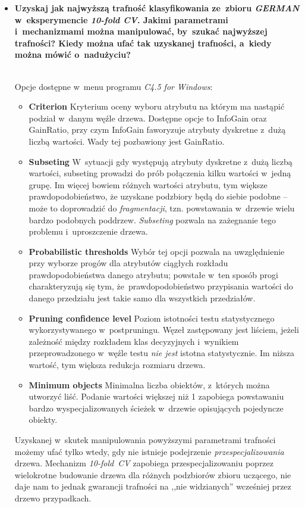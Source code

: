 \begin{itemize}
\item \textbf{Uzyskaj jak najwyższą trafność klasyfikowania ze~zbioru \emph{GERMAN} w~eksperymencie \emph{10-fold CV}. Jakimi parametrami i~mechanizmami można manipulować, by~szukać najwyższej trafności? Kiedy można ufać tak uzyskanej trafności, a~kiedy można mówić o~nadużyciu?}

\\Opcje dostępne w~menu programu \emph{C4.5 for Windows}:
\begin{itemize}
\item \textbf{Criterion} 
Kryterium oceny wyboru atrybutu na którym ma nastąpić podział w~danym węźle drzewa. Dostępne opcje to InfoGain oraz GainRatio, przy czym InfoGain faworyzuje atrybuty dyskretne z~dużą liczbą wartości. Wady tej pozbawiony jest GainRatio.

\item \textbf{Subseting} 
W~sytuacji gdy występują atrybuty dyskretne z~dużą liczbą wartości, subseting prowadzi do prób połączenia kilku wartości w~jedną grupę. Im więcej bowiem różnych wartości atrybutu, tym większe prawdopodobieństwo, że uzyskane podzbiory będą do siebie podobne -- może to doprowadzić do \emph{fragmentacji}, tzn. powstawania w~drzewie wielu bardzo podobnych poddrzew. \emph{Subseting} pozwala na zażegnanie tego problemu i~uproszczenie drzewa.

\item \textbf{Probabilistic thresholds}
Wybór tej opcji pozwala na uwzględnienie przy wyborze progów dla atrybutów ciągłych rozkładu prawdopodobieństwa danego atrybutu; powstałe w~ten sposób progi charakteryzują się tym, że~prawdopodobieństwo przypisania wartości do danego przedziału jest takie samo dla wszystkich przedziałów.

\item \textbf{Pruning confidence level} 
Poziom istotności testu statystycznego wykorzystywanego w~postpruningu. Węzeł zastępowany jest liściem, jeżeli zależność między rozkładem klas decyzyjnych i~wynikiem przeprowadzonego w~węźle testu \emph{nie jest} istotna statystycznie. Im niższa wartość, tym większa redukcja rozmiaru drzewa.

\item \textbf{Minimum objects}
Minimalna liczba obiektów, z~których można utworzyć liść. Podanie wartości większej niż 1 zapobiega powstawaniu bardzo wyspecjalizowanych ścieżek w~drzewie opisujących pojedyncze obiekty.
\end{itemize}

Uzyskanej w~skutek manipulowania powyższymi parametrami trafności możemy ufać tylko wtedy, gdy nie istnieje podejrzenie \emph{przespecjalizowania} drzewa. Mechanizm \emph{10-fold~CV} zapobiega przespecjalizowaniu poprzez wielokrotne budowanie drzewa dla różnych podzbiorów zbioru uczącego, nie daje nam to jednak gwarancji trafności na ,,nie widzianych'' wcześniej przez drzewo przypadkach.

\end{itemize}